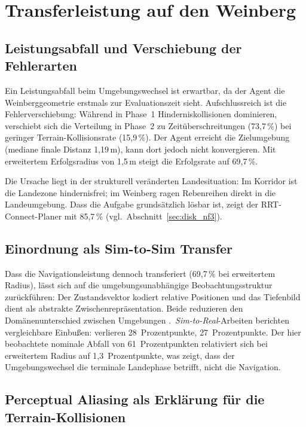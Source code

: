 \section{Transferleistung auf den Weinberg}
\label{sec:disk_nf2}

\subsection{Leistungsabfall und Verschiebung der Fehlerarten}

Ein Leistungsabfall beim Umgebungswechsel ist erwartbar, da der
Agent die Weinberggeometrie erstmals zur Evaluationszeit sieht. Aufschlussreich
ist die Fehlerverschiebung: Während in Phase~1 Hinderniskollisionen
dominieren, verschiebt sich die Verteilung in Phase~2 zu
Zeitüberschreitungen (73,7\,\%) bei geringer Terrain-Kollisionsrate
(15,9\,\%). Der Agent erreicht die Zielumgebung (mediane finale Distanz
1,19\,m), kann dort jedoch nicht konvergieren. Mit erweitertem
Erfolgsradius von 1,5\,m steigt die Erfolgsrate auf 69,7\,\%.

Die Ursache liegt in der strukturell veränderten Landesituation: Im
Korridor ist die Landezone hindernisfrei; im Weinberg ragen Rebenreihen
direkt in die Landeumgebung. Dass die Aufgabe grundsätzlich lösbar ist,
zeigt der RRT-Connect-Planer mit 85,7\,\%
(vgl.\ Abschnitt~\ref{sec:disk_nf3}).

\subsection{Einordnung als Sim-to-Sim Transfer}

Dass die Navigationsleistung dennoch transferiert (69,7\,\% bei erweitertem
Radius), lässt sich auf die umgebungsunabhängige Beobachtungsstruktur
zurückführen: Der Zustandsvektor kodiert relative Positionen und das
Tiefenbild dient als abstrakte Zwischenrepräsentation. Beide reduzieren den
Domänenunterschied zwischen Umgebungen \autocite{bartolomeiAutonomousEmergencyLanding2022,
loquercioLearningHighspeedFlight2021}.\ \textit{Sim-to-Real}-Arbeiten
berichten vergleichbare Einbußen:
\textcite{polvaraSimtoRealQuadrotorLanding2020} verlieren
28~Prozentpunkte, \textcite{ladoszAutonomousLandingMoving2024}
27~Prozentpunkte. Der hier beobachtete nominale Abfall von
61~Prozentpunkten relativiert sich bei erweitertem Radius auf
1,3~Prozentpunkte, was zeigt, dass der Umgebungswechsel die terminale
Landephase betrifft, nicht die Navigation.

\subsection{Perceptual Aliasing als Erklärung für die Terrain-Kollisionen}

